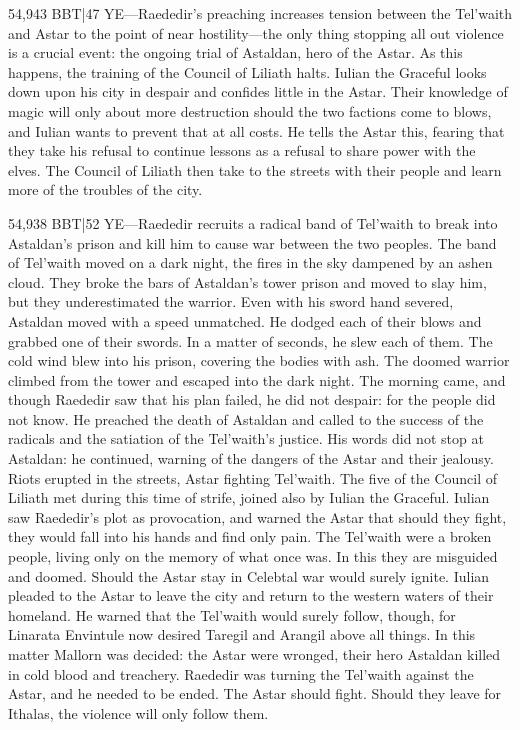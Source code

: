 \documentclass[smalldemyvopaper,11pt,twoside,onecolumn,openright,extrafontsizes]{memoir}
\begin{document}
54,943 BBT|47 YE—Raededir’s preaching increases tension between the Tel’waith and Astar to the point of near hostility—the only thing stopping all out violence is a crucial event: the ongoing trial of Astaldan, hero of the Astar. As this happens, the training of the Council of Liliath halts. Iulian the Graceful looks down upon his city in despair and confides little in the Astar. Their knowledge of magic will only about more destruction should the two factions come to blows, and Iulian wants to prevent that at all costs. He tells the Astar this, fearing that they take his refusal to continue lessons as a refusal to share power with the elves. The Council of Liliath then take to the streets with their people and learn more of the troubles of the city.

54,938 BBT|52 YE—Raededir recruits a radical band of Tel’waith to break into Astaldan’s prison and kill him to cause war between the two peoples. The band of Tel’waith moved on a dark night, the fires in the sky dampened by an ashen cloud. They broke the bars of Astaldan’s tower prison and moved to slay him, but they underestimated the warrior. Even with his sword hand severed, Astaldan moved with a speed unmatched. He dodged each of their blows and grabbed one of their swords. In a matter of seconds, he slew each of them. The cold wind blew into his prison, covering the bodies with ash. The doomed warrior climbed from the tower and escaped into the dark night.
The morning came, and though Raededir saw that his plan failed, he did not despair: for the people did not know. He preached the death of Astaldan and called to the success of the radicals and the satiation of the Tel’waith’s justice. His words did not stop at Astaldan: he continued, warning of the dangers of the Astar and their jealousy. Riots erupted in the streets, Astar fighting Tel’waith.
The five of the Council of Liliath met during this time of strife, joined also by Iulian the Graceful. Iulian saw Raededir’s plot as provocation, and warned the Astar that should they fight, they would fall into his hands and find only pain. The Tel’waith were a broken people, living only on the memory of what once was. In this they are misguided and doomed. Should the Astar stay in Celebtal war would surely ignite. Iulian pleaded to the Astar to leave the city and return to the western waters of their homeland. He warned that the Tel’waith would surely follow, though, for Linarata Envintule now desired Taregil and Arangil above all things.
In this matter Mallorn was decided: the Astar were wronged, their hero Astaldan killed in cold blood and treachery. Raededir was turning the Tel’waith against the Astar, and he needed to be ended. The Astar should fight. Should they leave for Ithalas, the violence will only follow them.
\end{document}
